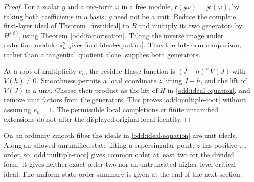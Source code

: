 \begin{proof}
For a scalar $g$ and a one-form $\omega$ in a free module,
$\mathfrak c(g\omega)=g\mathfrak c(\omega)$, by taking both
coefficients in a basis; $g$ need not be a unit. Reduce the complete
first-layer ideal of Theorem~\ref{first:ideal} to $B$ and multiply
its two generators by $H^{\langle\ell\rangle}$, using
Theorem~\ref{odd:factorisation}. Taking the inverse image under
reduction modulo $\pi_a^2$ gives \eqref{odd:ideal-equation}.
Thus the full-form comparison, rather than a tangential quotient
alone, supplies both generators.

At a root of multiplicity $e_h$, the residue Hasse function is
$(J-h)^{e_h}V(J)$ with $V(h)\ne0$. Smoothness permits a local
coordinate $z$ lifting $J-h$, and the lift of $V(J)$ is a unit.
Choose their product as the lift of $H$ in
\eqref{odd:ideal-equation}, and remove unit factors from the
generators. This proves \eqref{odd:multiple-root} without assuming
$e_h=1$. The permissible local completions or finite unramified
extensions do not alter the displayed original local identity.
\end{proof}

On an ordinary smooth fiber the ideals in
\eqref{odd:ideal-equation} are unit ideals. Along an allowed
unramified state lifting a supersingular point, $z$ has positive
$\pi_a$-order, so \eqref{odd:multiple-root} gives common order
at least two for the divided form. It gives neither exact order
two nor an untruncated higher-level critical ideal. The uniform
state-order summary is given at the end of the next section.
